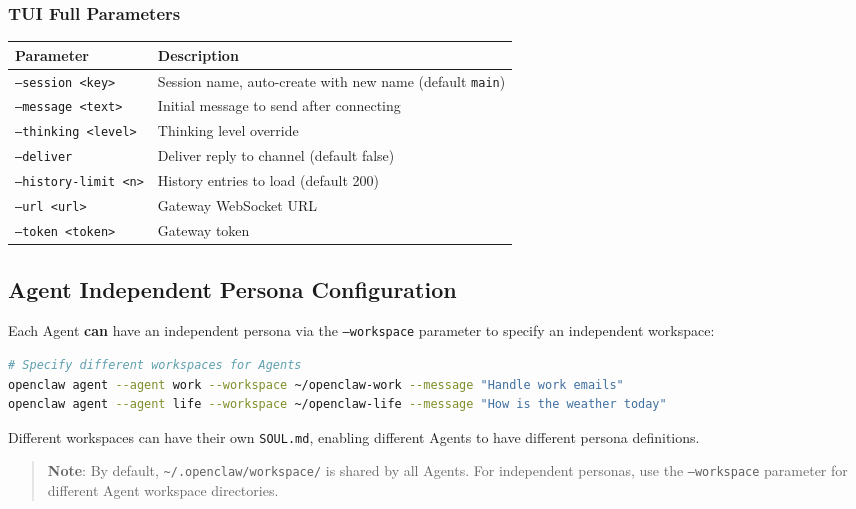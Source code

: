 \subsubsection{TUI Full Parameters}


\begin{table}[h]
\centering
\small
\begin{tabular}{|l|l|}
\hline
Parameter & Description \\
\hline
\texttt{--session <key>} & Session name, auto-create with new name (default \texttt{main}) \\
\hline
\texttt{--message <text>} & Initial message to send after connecting \\
\hline
\texttt{--thinking <level>} & Thinking level override \\
\hline
\texttt{--deliver} & Deliver reply to channel (default false) \\
\hline
\texttt{--history-limit <n>} & History entries to load (default 200) \\
\hline
\texttt{--url <url>} & Gateway WebSocket URL \\
\hline
\texttt{--token <token>} & Gateway token \\
\hline
\end{tabular}
\end{table}

\subsection{Agent Independent Persona Configuration}


Each Agent \textbf{can} have an independent persona via the \texttt{--workspace} parameter to specify an independent workspace:

\begin{lstlisting}[language=bash]
# Specify different workspaces for Agents
openclaw agent --agent work --workspace ~/openclaw-work --message "Handle work emails"
openclaw agent --agent life --workspace ~/openclaw-life --message "How is the weather today"
\end{lstlisting}

Different workspaces can have their own \texttt{SOUL.md}, enabling different Agents to have different persona definitions.

\begin{quote}
\textbf{Note}: By default, \texttt{\textasciitilde{}/.openclaw/workspace/} is shared by all Agents. For independent personas, use the \texttt{--workspace} parameter for different Agent workspace directories.
\end{quote}

